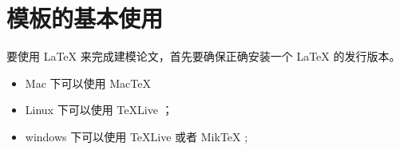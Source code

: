 \documentclass[withoutpreface,bwprint]{cumcmthesis} %
\begin{document}
\begin{abstract}
为全国大学生数学建模竞赛编写为全国大学生数学建模竞赛编写
为全国大学生数学建模竞赛编写
为全国大学生数学建模竞赛编写
为全国大学生数学建模竞赛编写
为全国大学生数学建模竞赛编写
为全国大学生数学建模竞赛编写
为全国大学生数学建模竞赛编写
为全国大学生数学建模竞赛编写

为全国大学生数学建模竞赛编写
为全国大学生数学建模竞赛编写
为全国大学生数学建模竞赛编写

\begin{mdframed} [%
	roundcorner=5pt,
	linecolor=gray!50,
	outerlinewidth=0.5pt,
	middlelinewidth=0.3pt, backgroundcolor=gray!2,
innertopmargin=\topskip, frametitle={2023 年建模比赛格式变化说明},
frametitlefont= \bfseries,frametitlerule=true,frametitlealignment =\raggedright\noindent,
frametitlerulewidth=.5pt, frametitlebackgroundcolor=gray!2,]
今年的格式变化主要就是一个地方，如下：
\begin{enumerate}
\item 论文第一页为承诺书，\textbf{\color{red}内容进行了调整}。

 

\end{enumerate}

\end{mdframed}


\url{https://www.latexstudio.net} 陆续推出了更优质的资源，欢迎学习 。

欢迎大家到QQ群里沟通交流：91940767/478023327/640633524。我们也开通了问答区交流 \LaTeX{}技术：\url{https://ask.latexstudio.net}，欢迎大家前来交流，有问题就来这里，与大神零距离。

：

\centerline{\texttt{[image: gongzhonghao2]}}

\end{abstract}



\section{模板的基本使用}

要使用 \LaTeX{} 来完成建模论文，首先要确保正确安装一个 \LaTeX{} 的发行版本。

\begin{itemize}
    \item Mac 下可以使用 Mac\TeX{}
    \item Linux 下可以使用 \TeX{}Live ；
    \item windows 下可以使用 \TeX{}Live 或者 Mik\TeX{} ;
\end{itemize}
\end{document}

